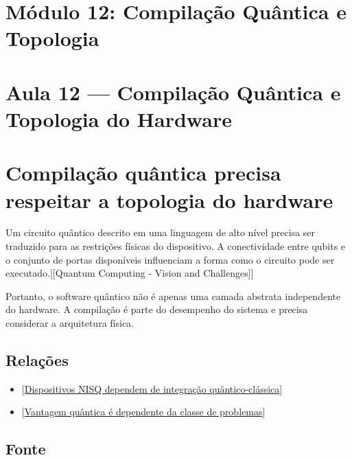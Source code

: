\documentclass[
  brazilian,
]{report}
\providecommand{\tightlist}{%
  \setlength{\itemsep}{0pt}\setlength{\parskip}{0pt}}
\begin{document}
\newpage

\chapter{Módulo 12: Compilação Quântica e
Topologia}\label{muxf3dulo-12-compilauxe7uxe3o-quuxe2ntica-e-topologia}

\chapter{Aula 12 --- Compilação Quântica e Topologia do
Hardware}\label{aula-12-compilauxe7uxe3o-quuxe2ntica-e-topologia-do-hardware}

\chapter{Compilação quântica precisa respeitar a topologia do
hardware}\label{compilauxe7uxe3o-quuxe2ntica-precisa-respeitar-a-topologia-do-hardware}

Um circuito quântico descrito em uma linguagem de alto nível precisa ser
traduzido para as restrições físicas do dispositivo. A conectividade
entre qubits e o conjunto de portas disponíveis influenciam a forma como
o circuito pode ser executado.{[}{[}Quantum Computing - Vision and
Challenges{]}{]}

Portanto, o software quântico não é apenas uma camada abstrata
independente do hardware. A compilação é parte do desempenho do sistema
e precisa considerar a arquitetura física.

\section{Relações}\label{relauxe7uxf5es-1}

\begin{itemize}
\tightlist
\item
  {[}\hyperref[dispositivos-nisq-dependem-de-integrauxe7uxe3o-quuxe2ntico-cluxe1ssica]{Dispositivos
  NISQ dependem de integração quântico-clássica}{]}
\item
  {[}\hyperref[vantagem-quuxe2ntica-uxe9-dependente-da-classe-de-problemas]{Vantagem
  quântica é dependente da classe de problemas}{]}
\end{itemize}

\section{Fonte}\label{fonte-1}
\end{document}
